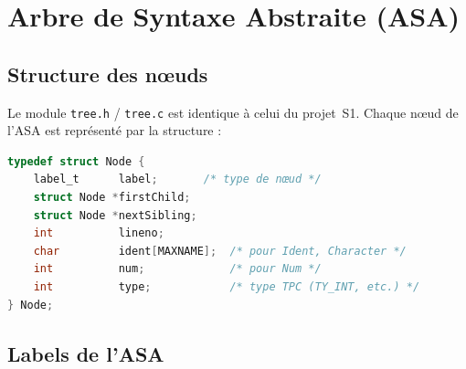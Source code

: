 \documentclass[12pt,a4paper]{article}
\begin{document}
\section{Arbre de Syntaxe Abstraite (ASA)}

\subsection{Structure des nœuds}

Le module \texttt{tree.h} / \texttt{tree.c} est identique à celui du projet~S1.
Chaque nœud de l'ASA est représenté par la structure :

\begin{lstlisting}[language=C, caption={Structure d'un nœud ASA}]
typedef struct Node {
    label_t      label;       /* type de nœud */
    struct Node *firstChild;
    struct Node *nextSibling;
    int          lineno;
    char         ident[MAXNAME];  /* pour Ident, Character */
    int          num;             /* pour Num */
    int          type;            /* type TPC (TY_INT, etc.) */
} Node;
\end{lstlisting}

\subsection{Labels de l'ASA}
\end{document}
